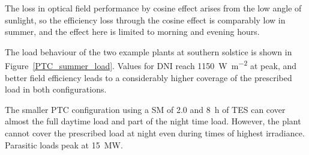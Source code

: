 %

The loss in optical field performance by cosine effect arises from the low angle of sunlight, so the efficiency loss through the cosine effect is comparably low in summer, and the effect here is limited to morning and evening hours. 


The load behaviour of the two example plants at southern solstice is shown in Figure~\ref{PTC_summer_load}. Values for \ac{DNI} reach \SI{1150}{\watt\per\square\metre} at peak, and better field efficiency leads to a considerably higher coverage of the prescribed load in both configurations. 


The smaller \ac{PTC} configuration using a \ac{SM} of \num{2.0} and \SI{8}{h} of \ac{TES} can cover almost the full daytime load and part of the night time load. However, the plant cannot cover the prescribed load at night even during times of highest irradiance. Parasitic loads peak at \SI{15}{MW}. 


